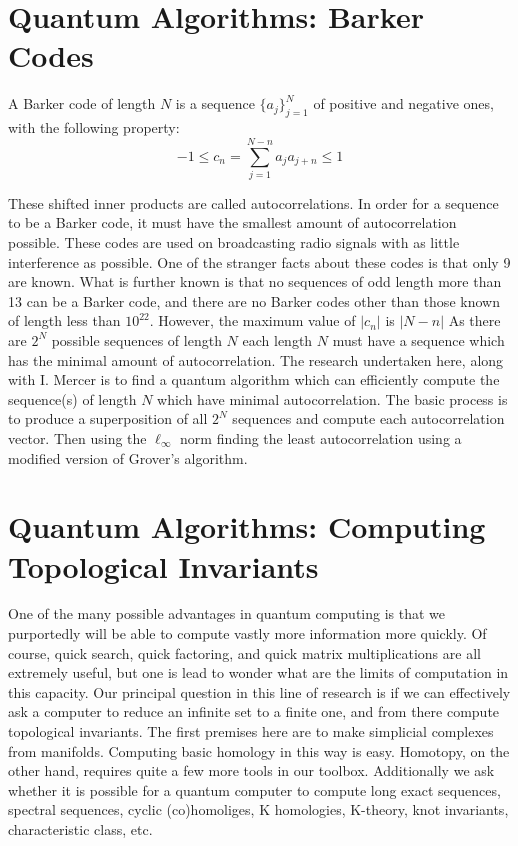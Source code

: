 \documentclass[10 pt]{amsart}
\theoremstyle{definition}
\theoremstyle{remark}
\numberwithin{equation}{subsection}
\begin{document}
\section*{Quantum Algorithms: Barker Codes}

\indent A Barker code of length $N$ is a sequence $\{a_j\}_{j=1}^{N}$ of positive and negative ones, with the following property:
\[
-1 \le c_n = \sum_{j=1}^{N-n} a_j a_{j+n} \le 1
\]

These shifted inner products are called autocorrelations.  In order for a sequence to be a Barker code, it must have the smallest amount of autocorrelation possible.  These codes are used on broadcasting radio signals with as little interference as possible.  One of the stranger facts about these codes is that only 9 are known.  What is further known is that no sequences of odd length more than 13 can be a Barker code, and there are no Barker codes other than those known of length less than $10^{22}$.  However, the maximum value of $|c_n|$ is $|N-n|$ As there are $2^N$ possible sequences of length $N$ each length $N$ must have a sequence which has the minimal amount of autocorrelation.  The research undertaken here, along with I. Mercer is to find a quantum algorithm which can efficiently compute the sequence(s) of length $N$ which have minimal autocorrelation.  The basic process is to produce a superposition of all $2^N$ sequences and compute each autocorrelation vector.  Then using the $\ell_{\infty}$ norm finding the least autocorrelation using a modified version of Grover's algorithm.



\section*{Quantum Algorithms: Computing Topological Invariants}

\indent One of the many possible advantages in quantum computing is that we purportedly will be able to compute vastly more information more quickly.  Of course, quick search, quick factoring, and quick matrix multiplications are all extremely useful, but one is lead to wonder what are the limits of computation in this capacity.  Our principal question in this line of research is if we can effectively ask a computer to reduce an infinite set to a finite one, and from there compute topological invariants.  The first premises here are to make simplicial complexes from manifolds.  Computing basic homology in this way is easy.  Homotopy, on the other hand, requires quite a few more tools in our toolbox.  Additionally we ask whether it is possible for a quantum computer to compute long exact sequences, spectral sequences, cyclic (co)homoliges, K homologies, K-theory, knot invariants, characteristic class, etc.
\end{document}
